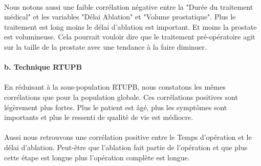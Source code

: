 \documentclass[11pt]{article}
\begin{document}
    \begin{center}
    \end{center}
    
    
\paragraph{}
Nous notons aussi une faible corrélation négative entre la "Durée du
traitement médical" et les variables "Délai Ablation" et "Volume
prostatique". Plus le traitement est long moins le délai d'ablation est
important. Et moins la prostate est volumineuse. Cela pourrait vouloir
dire que le traitement pré-opératoire agit sur la taille de la prostate
avec une tendance à la faire diminuer.



    \begin{center}
    \end{center}
    
    
    \begin{center}
    \end{center}
    
    
    \paragraph{b. Technique RTUPB}\label{b.-technique-rtupb}



    \begin{center}
    \end{center}
    
    
\paragraph{}
En réduisant à la sous-population RTUPB, nous constatons les mêmes
corrélations que pour la population globale. Ces corrélations positives
sont légèrement plus fortes. Plus le patient est âgé, plus les symptômes
sont importants et plus le ressenti de qualité de vie est médiocre.
\paragraph{}
Aussi nous retrouvons une corrélation positive entre le Temps
d'opération et le délai d'ablation. Peut-être que l'ablation fait partie
de l'opération et que plus cette étape est longue plus l'opération
complète est longue.
\end{document}
